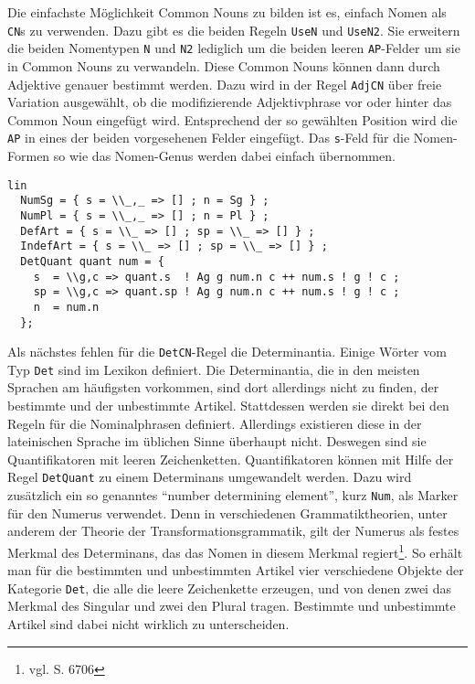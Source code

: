 Die einfachste Möglichkeit Common Nouns zu bilden ist es, einfach Nomen als \texttt{CN}s zu verwenden. Dazu gibt es die beiden Regeln \texttt{UseN} und \texttt{UseN2}. Sie erweitern die beiden Nomentypen \texttt{N} und \texttt{N2} lediglich um die beiden leeren \texttt{AP}-Felder um sie in Common Nouns zu verwandeln. Diese Common Nouns können dann durch Adjektive genauer bestimmt werden. Dazu wird in der Regel \texttt{AdjCN} über freie Variation ausgewählt, ob die modifizierende Adjektivphrase vor oder hinter das Common Noun eingefügt wird. Entsprechend der so gewählten Position wird die \texttt{AP} in eines der beiden vorgesehenen Felder eingefügt. Das \texttt{s}-Feld für die Nomen-Formen so wie das Nomen-Genus werden dabei einfach übernommen. \par
\begin{lstlisting}[float=h!tp,caption={Die Syntaxregeln \texttt{DetQuant} um aus einem Number Determining Element und einem Quantifikator ein \texttt{Det} zu erzeugen (vgl. \textbf{NounLat.gf}},label={GF-Noun-DetQuant}]
lin
  NumSg = { s = \\_,_ => [] ; n = Sg } ;
  NumPl = { s = \\_,_ => [] ; n = Pl } ;
  DefArt = { s = \\_ => [] ; sp = \\_ => [] } ;
  IndefArt = { s = \\_ => [] ; sp = \\_ => [] } ;
  DetQuant quant num = {
    s  = \\g,c => quant.s  ! Ag g num.n c ++ num.s ! g ! c ;
    sp = \\g,c => quant.sp ! Ag g num.n c ++ num.s ! g ! c ;
    n  = num.n
  };
\end{lstlisting}
Als nächstes fehlen für die \texttt{DetCN}-Regel die Determinantia. Einige Wörter vom Typ \texttt{Det} sind im Lexikon definiert. Die Determinantia, die in den meisten Sprachen am häufigsten vorkommen, sind dort allerdings nicht zu finden, der bestimmte und der unbestimmte Artikel. Stattdessen werden sie direkt bei den Regeln für die Nominalphrasen definiert. Allerdings existieren diese in der lateinischen Sprache im üblichen Sinne überhaupt nicht. Deswegen sind sie Quantifikatoren mit leeren Zeichenketten. Quantifikatoren können mit Hilfe der Regel \texttt{DetQuant} zu einem Determinans umgewandelt werden. Dazu wird zusätzlich ein so genanntes "`number determining element"', kurz \texttt{Num}, als Marker für den Numerus verwendet. Denn in verschiedenen Grammatiktheorien, unter anderem der Theorie der Transformationsgrammatik, gilt der Numerus als festes Merkmal des Determinans, das das Nomen in diesem Merkmal regiert\footnote{vgl. \cite{METZLER2004} S. 6706}. So erhält man für die bestimmten und unbestimmten Artikel vier verschiedene Objekte der Kategorie \texttt{Det}, die alle die leere Zeichenkette erzeugen, und von denen zwei das Merkmal des Singular und zwei den Plural tragen. Bestimmte und unbestimmte Artikel sind dabei nicht wirklich zu unterscheiden. \par
